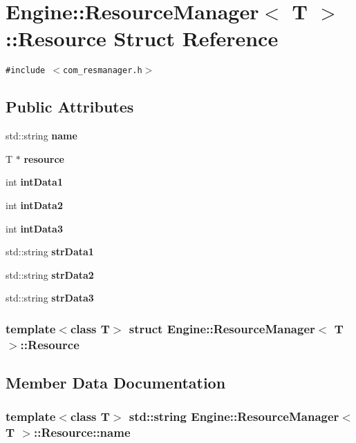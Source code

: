 \section{Engine::ResourceManager$<$ T $>$::Resource Struct Reference}
\label{structEngine_1_1ResourceManager_1_1Resource}
{\tt \#include $<$com\_\-resmanager.h$>$}

\subsection*{Public Attributes}
\begin{CompactItemize}
\item 
std::string {\bf name}
\item 
T $\ast$ {\bf resource}
\item 
int {\bf intData1}
\item 
int {\bf intData2}
\item 
int {\bf intData3}
\item 
std::string {\bf strData1}
\item 
std::string {\bf strData2}
\item 
std::string {\bf strData3}
\end{CompactItemize}
\subsubsection*{template$<$class T$>$ struct Engine::ResourceManager$<$ T $>$::Resource}



\subsection{Member Data Documentation}
\subsubsection{\setlength{\rightskip}{0pt plus 5cm}template$<$class T$>$ std::string {\bf Engine::ResourceManager}$<$ T $>$::{\bf Resource::name}}\label{structEngine_1_1ResourceManager_1_1Resource_644284457dcfd26197e0360fdd265035}



